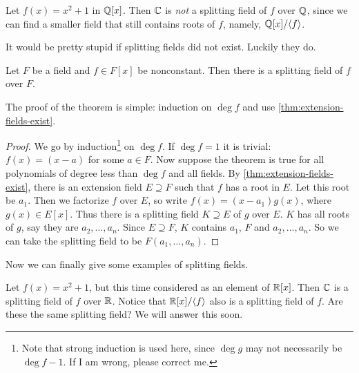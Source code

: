\documentclass[oneside]{book}
\begin{document}
\begin{example}
    Let $f(x) = x^2 + 1$ in $\mathbb{Q}[x]$. Then $\mathbb{C}$ is \emph{not} a splitting field
    of $f$ over $\mathbb{Q}$, since we can find a smaller field that still contains
    roots of $f$, namely, $\mathbb{Q}[x]/{ \langle f \rangle }$.
\end{example}

It would be pretty stupid if splitting fields did not exist. Luckily they do.
\begin{theorem}
    Let $F$ be a field and $f \in F[x]$ be nonconstant. Then there is a
    splitting field of $f$ over $F$.
\end{theorem}
The proof of the theorem is simple: induction on $\deg f$ and use
\cref{thm:extension-fields-exist}.
\begin{proof}
    We go by induction\footnote{Note that strong induction is used here, since
    $\deg g$ may not necessarily be $\deg f - 1$. If I am wrong, please correct
    me.} on $\deg f$. If $\deg f = 1$ it is trivial: $f(x) = (x-a)$ for some $a
    \in F$. Now suppose the theorem is true for all polynomials of degree less
    than $\deg f$ and all fields. By \cref{thm:extension-fields-exist}, there is
    an extension field $E \supseteq F$ such that $f$ has a root in $E$. Let this
    root be $a_1$. Then we factorize $f$ over $E$, so write $f(x) = (x-a_1)
    g(x)$, where $g(x) \in E[x]$. Thus there is a splitting field $K \supseteq
    E$ of $g$ over $E$. $K$ has all roots of $g$, say they are $a_2, \dots,
    a_n$. Since $E \supseteq F$, $K$ contains $a_1$, $F$ and $a_2, \dots, a_n$.
    So we can take the splitting field to be $F(a_1, \dots, a_n)$.
\end{proof}

Now we can finally give some examples of splitting fields.

\begin{example}
    Let $f(x) = x^2 + 1$, but this time considered as an element of $\mathbb{R}[x]$.
    Then $\mathbb{C}$ is a splitting field of $f$ over $\mathbb{R}$. Notice that $\mathbb{R}[x] /
    { \langle f \rangle }$ also is a splitting field of $f$. Are these the same splitting
    field? We will answer this soon.
\end{example}

\backmatter
{}
\nocite{*}
\printbibliography
\end{document}
